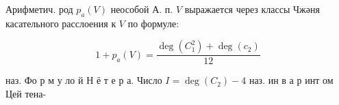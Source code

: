 \documentclass[10pt]{article}
\begin{document}
Арифметич. род $p_{a}(V)$ неособой А. п. $V$ выражается через классы Чжәня касательного расслоения к $V$ по формуле:



\[

1+p_{a}(V)=\frac{\operatorname{deg}\left(C_{1}^{2}\right)+\operatorname{deg}\left(c_{2}\right)}{12}

\]



наз. Фо р м у ло й Н ё т е р а. Число $I=\operatorname{deg}\left(C_{2}\right)-4$ наз. ин в а р инт ом Цей тена-
\end{document}
